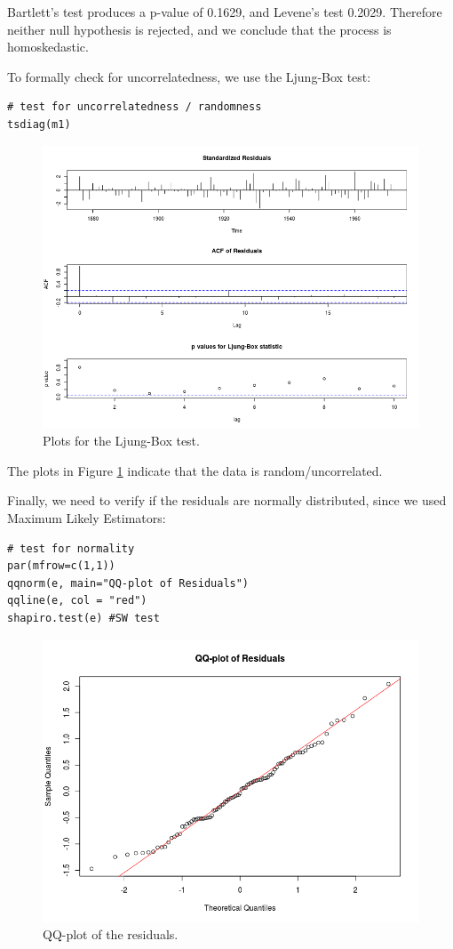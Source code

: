 \documentclass[]{article}
\begin{document}
Bartlett's test produces a p-value of 0.1629, and Levene's test 0.2029. Therefore neither null hypothesis is rejected, and we conclude that the process is homoskedastic.

To formally check for uncorrelatedness, we use the Ljung-Box test:
\begin{Verbatim}[frame=single]
# test for uncorrelatedness / randomness
tsdiag(m1)
\end{Verbatim}

\begin{figure}[!ht]
\centering
\includegraphics[width=.8\textwidth]{huronljung.png}
\caption{Plots for the Ljung-Box test.}
\label{huronljung}
\end{figure}

The plots in Figure \ref{huronljung} indicate that the data is random/uncorrelated.

Finally, we need to verify if the residuals are normally distributed, since we used Maximum Likely Estimators:
\begin{Verbatim}[frame=single]
# test for normality
par(mfrow=c(1,1))
qqnorm(e, main="QQ-plot of Residuals")
qqline(e, col = "red")
shapiro.test(e) #SW test
\end{Verbatim}

\begin{figure}[!ht]
\centering
\includegraphics[width=.8\textwidth]{huronqq.png}
\caption{QQ-plot of the residuals.}
\label{huronqq}
\end{figure}
\end{document}
